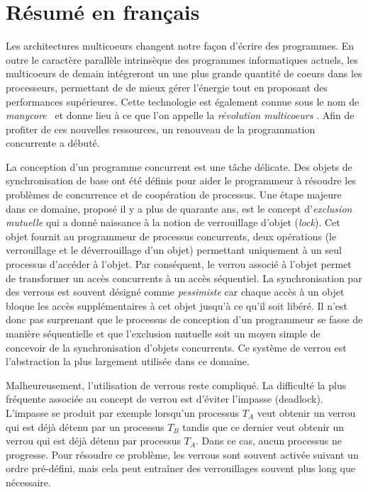 

\chapter{Résumé en français}

Les architectures multicoeurs changent notre façon d'écrire des programmes.
En outre le caractère parallèle intrinsèque des programmes informatiques actuels,
les multicoeurs de demain intégreront un une plus grande quantité de coeurs dans les processeurs, permettant 
de de mieux gérer l'énergie tout en proposant des performances supérieures.
Cette technologie est également connue sous le nom de \emph{manycore}~\cite{Borkar2007} et donne lieu à ce que l'on appelle
la \emph{révolution multicoeurs} \cite{HL08}. Afin de profiter de ces nouvelles ressources, un renouveau de
la programmation concurrente a débuté.

La conception d'un programme concurrent est une tâche délicate.
Des objets de synchronisation de base ont été définis pour aider le programmeur à résoudre les problèmes de concurrence et de coopération de processus.
Une étape majeure dans ce domaine, proposé il y a plus de quarante ans, est le concept d'\textit{exclusion mutuelle} \cite{D68} qui a donné naissance à la notion de verrouillage d'objet (\textit{lock}).
Cet objet fournit au programmeur de processus concurrents, deux opérations (le verrouillage et le déverrouillage d'un objet) permettant uniquement à un seul processus d'accéder à l'objet.
Par conséquent, le verrou associé à l'objet permet de transformer un accès concurrents à un accès séquentiel.
La synchronisation par des verrous est souvent désigné comme \emph{pessimiste} car chaque accès à un objet bloque les accès supplémentaires à cet objet jusqu'à ce qu'il soit libéré. 
Il n'est donc pas surprenant que le processus de conception d'un programmeur se fasse de manière séquentielle et
que l'exclusion mutuelle soit un moyen simple de concevoir de la synchronisation d'objets concurrents. 
Ce système de verrou est l'abstraction la plus largement utilisée dans ce domaine.

Malheureusement, l'utilisation de verrous reste compliqué.
La difficulté la plus fréquente associée au concept de verrou est d'éviter l'impasse (deadlock).
L'impasse se produit par exemple lorsqu'un processus $T_A$ veut obtenir un verrou qui est déjà détenu par un processus
$T_B$ tandis que ce dernier veut obtenir un verrou qui est déjà détenu par processus $T_A$. Dans ce cas, aucun processus ne progresse.
Pour résoudre ce problème, les verrous sont souvent activée suivant un ordre pré-défini,
mais cela peut entraîner des verrouillages souvent plus long que nécessaire.

